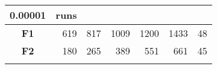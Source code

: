 \documentclass[12pt,a4paper]{article}
\begin{document}
\begin{longtable}[c]{@{}crrrrrr@{}}
\begin{minipage}[b]{0.11\columnwidth}
0.00001
\strut\end{minipage} &
\begin{minipage}[b]{0.07\columnwidth}\raggedleft\strut
runs
\strut\end{minipage}\tabularnewline
\midrule
\endhead
\begin{minipage}[t]{0.11\columnwidth}\centering\strut
\textbf{F1}
\strut\end{minipage} &
\begin{minipage}[t]{0.08\columnwidth}\raggedleft\strut
619
\strut\end{minipage} &
\begin{minipage}[t]{0.08\columnwidth}\raggedleft\strut
817
\strut\end{minipage} &
\begin{minipage}[t]{0.09\columnwidth}\raggedleft\strut
1009
\strut\end{minipage} &
\begin{minipage}[t]{0.10\columnwidth}\raggedleft\strut
1200
\strut\end{minipage} &
\begin{minipage}[t]{0.11\columnwidth}\raggedleft\strut
1433
\strut\end{minipage} &
\begin{minipage}[t]{0.07\columnwidth}\raggedleft\strut
48
\strut\end{minipage}\tabularnewline
\begin{minipage}[t]{0.11\columnwidth}\centering\strut
\textbf{F2}
\strut\end{minipage} &
\begin{minipage}[t]{0.08\columnwidth}\raggedleft\strut
180
\strut\end{minipage} &
\begin{minipage}[t]{0.08\columnwidth}\raggedleft\strut
265
\strut\end{minipage} &
\begin{minipage}[t]{0.09\columnwidth}\raggedleft\strut
389
\strut\end{minipage} &
\begin{minipage}[t]{0.10\columnwidth}\raggedleft\strut
551
\strut\end{minipage} &
\begin{minipage}[t]{0.11\columnwidth}\raggedleft\strut
661
\strut\end{minipage} &
\begin{minipage}[t]{0.07\columnwidth}\raggedleft\strut
45
\strut\end{minipage}\tabularnewline
\begin{minipage}[t]{0.11\columnwidth}\centering\strut

\end{minipage}
\end{longtable}
\end{document}
